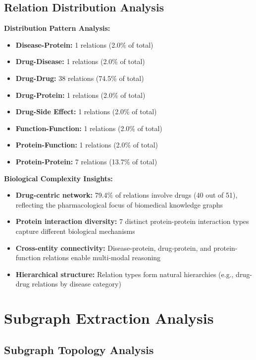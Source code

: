 \subsection{Relation Distribution Analysis}

\textbf{Distribution Pattern Analysis:}
\begin{itemize}
\item \textbf{Disease-Protein:} 1 relations (2.0\% of total)
\item \textbf{Drug-Disease:} 1 relations (2.0\% of total)
\item \textbf{Drug-Drug:} 38 relations (74.5\% of total)
\item \textbf{Drug-Protein:} 1 relations (2.0\% of total)
\item \textbf{Drug-Side Effect:} 1 relations (2.0\% of total)
\item \textbf{Function-Function:} 1 relations (2.0\% of total)
\item \textbf{Protein-Function:} 1 relations (2.0\% of total)
\item \textbf{Protein-Protein:} 7 relations (13.7\% of total)
\end{itemize}

\textbf{Biological Complexity Insights:}
\begin{itemize}
\item \textbf{Drug-centric network:} 79.4\% of relations involve drugs (40 out of 51), reflecting the pharmacological focus of biomedical knowledge graphs
\item \textbf{Protein interaction diversity:} 7 distinct protein-protein interaction types capture different biological mechanisms
\item \textbf{Cross-entity connectivity:} Disease-protein, drug-protein, and protein-function relations enable multi-modal reasoning
\item \textbf{Hierarchical structure:} Relation types form natural hierarchies (e.g., drug-drug relations by disease category)
\end{itemize}

\section{Subgraph Extraction Analysis}
\label{app:subgraph}

\subsection{Subgraph Topology Analysis}


